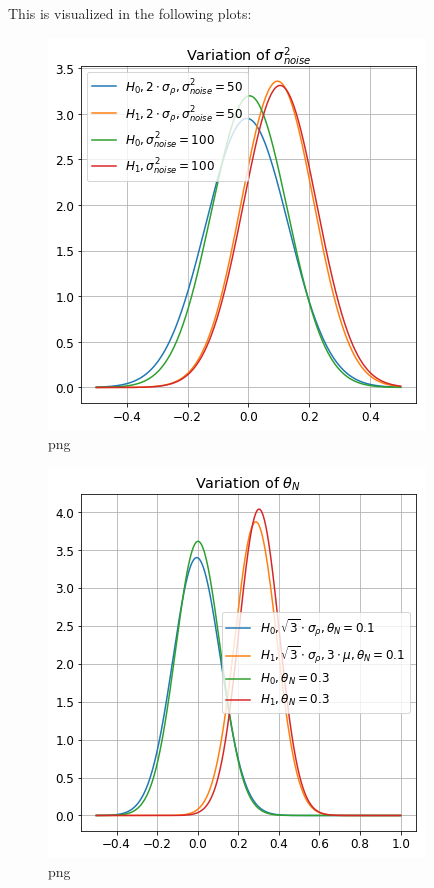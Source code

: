 This is visualized in the following plots:

\begin{figure}
\centering
\includegraphics{output_12_0.png}
\caption{png}
\end{figure}

\begin{figure}
\centering
\includegraphics{output_12_1.png}
\caption{png}
\end{figure}

